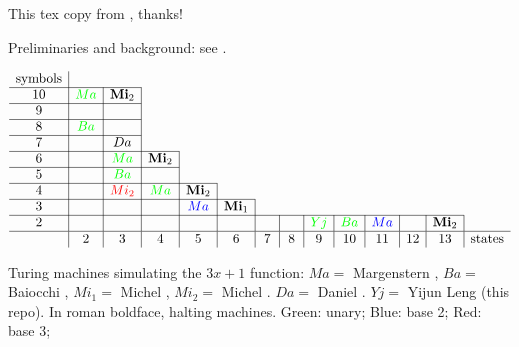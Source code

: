 \documentclass[10pt]{article}
\date{Feburary 23, 2025}
\begin{document}
This tex copy from \cite{Mi14}, thanks!

Preliminaries and background: see \cite{Mi14}.

\begin{table}
$$\begin{array}{c|c|c|c|c|c|c|c|c|c|c|c|c|c}
\mbox{symbols} & \multicolumn{13}{c}{}\\                                                \cline{1-3}
10             & \textcolor{green}{Ma}    & \mbox{\bf Mi}_2& \multicolumn{11}{c}{}\\                       \cline{1-3}
9              &       &      &\multicolumn{11}{c}{}\\                                  \cline{1-3}
8              & \textcolor{green}{Ba}    &      &\multicolumn{11}{c}{}\\                                  \cline{1-3}
7              &       & Da   			 &\multicolumn{11}{c}{}\\                                  \cline{1-4}
6              &       & \textcolor{green}{Ma}   &  \mbox{\bf Mi}_2 & \multicolumn{10}{c}{}\\          \cline{1-4}
5              &       & \textcolor{green}{Ba}   &                  & \multicolumn{10}{c}{}\\          \cline{1-5}
4              &       & \textcolor{red}{Mi_2} & \textcolor{green}{Ma}               &\mbox{\bf Mi}_2 & \multicolumn{9}{c}{}\\         \cline{1-6}
3              &       &      &                  & \textcolor{blue}{Ma}   &\mbox{\bf Mi}_1 & \multicolumn{8}{c}{}\\  \cline{1-13}
2              &       &      &    &      &      &     &     & \textcolor{green}{Yj}  & \textcolor{green}{Ba}  & \textcolor{blue}{Ma} & & \mbox{\bf Mi}_2\\  \hline
               & 2     & 3    & 4  & 5    &\,6\, &\,7\,&\,8\,&\,9\,& 10  & 11 & 12 & 13 & \mbox{states}
\end{array}$$
\caption{Turing machines simulating the $3x + 1$ function:
$Ma=$ Margenstern \cite{Ma98,Ma00},
$Ba=$ Baiocchi \cite{Ba98},
$Mi_1=$ Michel \cite{Mi93},
$Mi_2=$ Michel \cite{Mi14}.
$Da=$ Daniel \cite{Da24}.
$Yj=$ Yijun Leng (this repo).
In roman boldface, halting machines.
Green: unary;
Blue: base 2;
Red: base 3;
}
\end{table}
\end{document}
